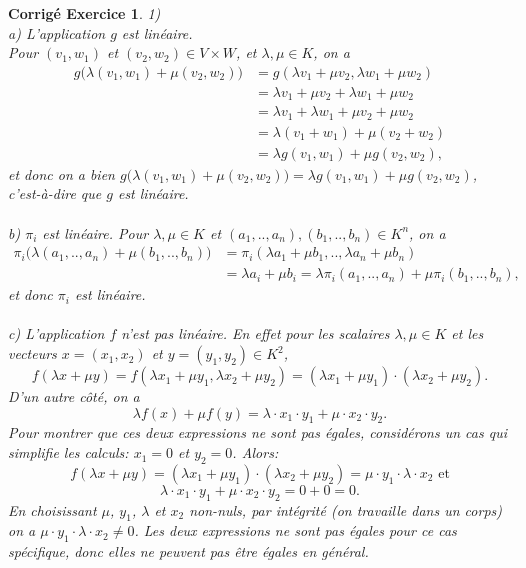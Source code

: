 \documentclass[11pt,french,table]{article}
\theoremstyle{exercice}
\theoremstyle{corrigé}
\newtheorem{corrigé}{Corrigé Exercice}
\begin{document}
\vspace{2em}
\begin{corrigé}
1) \\
a) L'application $g$ est linéaire. \\
Pour $(v_1,w_1)$ et $(v_2,w_2)\in V \times W$, et $\lambda, \mu \in K$, on a 
\begin{align*}
	g \big( \lambda(v_1,w_1)+ \mu(v_2,w_2) \big) &=g(\lambda v_1+ \mu v_2, \lambda w_1+ \mu w_2)\\ 
				     &=\lambda v_1+ \mu v_2 + \lambda w_1+ \mu w_2\\ 
				     &=\lambda v_1+ \lambda w_1 + \mu v_2+ \mu w_2 \\
&=\lambda (v_1+w_1)+ \mu(v_2+w_2) \\
&=\lambda g(v_1,w_1)+ \mu g(v_2,w_2),
\end{align*}
et donc on a bien $g \big( \lambda(v_1,w_1)+ \mu(v_2,w_2) \big) = \lambda g(v_1,w_1)+ \mu g(v_2,w_2)$, c'est-à-dire que $g$ est linéaire. \\
\\
b) $\pi_i$ est linéaire. Pour $\lambda, \mu \in K$ et $(a_1,..,a_n),(b_1,..,b_n) \in K^n$, on a 
\begin{align*}
	\pi_i \big( \lambda(a_1,..,a_n)+\mu(b_1,..,b_n) \big) &=\pi_i(\lambda a_1+\mu b_1,..,\lambda a_n+ \mu b_n)\\ 
					      &=\lambda a_i+ \mu b_i=\lambda \pi_i(a_1,..,a_n)+ \mu \pi_i(b_1,..,b_n),
\end{align*}
et donc $\pi_i$ est linéaire. \\
\\
c) L'application $f$ n'est pas linéaire. En effet pour les scalaires $\lambda, \mu \in K$ et les vecteurs $x = (x_1,x_2)$ et $y= (y_1,y_2) \in K^2$,
$$f( \lambda x + \mu y) = f (\lambda x_1 + \mu y_1, \lambda x_2 + \mu y_2) = (\lambda x_1 + \mu y_1) \cdot (\lambda x_2 + \mu y_2).$$
D'un autre côté, on a 
$$\lambda f(x) + \mu f(y) = \lambda \cdot x_1 \cdot y_1 + \mu \cdot x_2 \cdot y_2.$$
Pour montrer que ces deux expressions ne sont pas égales, considérons un cas qui simplifie les calculs: $x_1 = 0$  et $y_2 = 0$. Alors:
$$f( \lambda x + \mu y) = (\lambda x_1 + \mu y_1) \cdot (\lambda x_2 + \mu y_2) = \mu \cdot y_1 \cdot \lambda \cdot x_2 \text{ et}$$
$$\lambda \cdot x_1 \cdot y_1 + \mu \cdot x_2 \cdot y_2 = 0 + 0 = 0.$$
En choisissant $\mu$, $y_1$, $\lambda$ et $x_2$ non-nuls, par intégrité (on travaille dans un corps) on a $\mu \cdot y_1 \cdot \lambda \cdot x_2 \neq 0$. Les deux expressions ne sont pas égales pour ce cas spécifique, donc elles ne peuvent pas être égales en général. \\

\end{corrigé}
\end{document}
